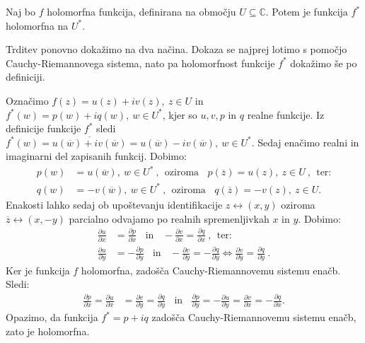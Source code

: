 \documentclass[mat1]{fmfdelo}
\begin{document}
    \begin{trditev}
        \label{lemahol}
        Naj bo $f$ holomorfna funkcija, definirana na območju $U \subseteq \mathbb{C}$.
        Potem je funkcija $f^*$ holomorfna na $U^*$.
    \end{trditev}
    \begin{dokaz}
        Trditev ponovno dokažimo na dva načina. Dokaza se najprej lotimo s pomočjo Cauchy-Riemannovega sistema, nato pa holomorfnost funkcije $f^*$ dokažimo še po definiciji.

        Označimo $f(z) = u(z) + iv(z),~ z \in U$ in $f^*(w) = p(w) + iq(w),~w \in U^*$, kjer so $u,v, p$ in $q$ realne funkcije. 
        Iz definicije funkcije $f^*$ sledi $f^*(w) = \overline{u(\overline{w}) + iv(\overline{w})} = u(\overline{w}) - iv(\overline{w}),~ w \in U^*$. 
        Sedaj enačimo realni in imaginarni del zapisanih funkcij. Dobimo:
        \begin{align*}
            p(w) &= u(\overline{w}),~w \in U^*~,~~\text{oziroma}~~~~p(\overline{z}) = u(z),~z \in U~,~~\text{ter:} \\
            q(w) &= -v(\overline{w}),~w \in U^*~,~~\text{oziroma}~~~~q(\overline{z}) = -v(z),~z \in U.
        \end{align*}
        Enakosti lahko sedaj ob upoštevanju identifikacije $z \leftrightarrow (x,y)$ oziroma $\overline{z} \leftrightarrow (x, -y)$ parcialno odvajamo po realnih spremenljivkah $x$ in $y$. Dobimo:
        \begin{align*}
            \frac{\partial u}{\partial x} &= \frac{\partial p}{\partial x}~~~~\text{in}~~~~ -\frac{\partial v}{\partial x} = \frac{\partial q}{\partial x}~,~~\text{ter:}\\
            \frac{\partial u}{\partial y} &=  - \frac{\partial p}{\partial y}~~~~\text{in}~~~~ -\frac{\partial v}{\partial y} = - \frac{\partial q}{\partial y} \iff \frac{\partial v}{\partial y} = \frac{\partial q}{\partial y}~.      
        \end{align*}
        Ker je funkcija $f$ holomorfna, zadošča Cauchy-Riemannovemu sistemu enačb.  
        Sledi: 
        \begin{align*}
            \frac{\partial p}{\partial x} = \frac{\partial u}{\partial x} &= \frac{\partial v}{\partial y} = \frac{\partial q}{\partial y}~~~~\text{in}~~~~ \frac{\partial p}{\partial y} = -\frac{\partial u}{\partial y} = \frac{\partial v}{\partial x} = -\frac{\partial q}{\partial x}.
        \end{align*}
        Opazimo, da funkcija $f^* = p + iq$ zadošča Cauchy-Riemannovemu sistemu enačb, zato je holomorfna.


\end{dokaz}
\end{document}
